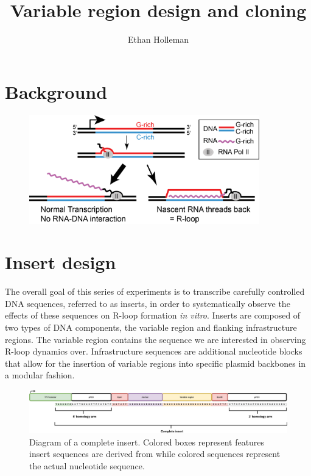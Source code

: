 \documentclass[11pt]{article}
\author{Ethan Holleman}
\title{Variable region design and cloning}
\begin{document}
\maketitle

\section{Background}



\begin{figure}[H]
	\includegraphics[width=10cm]{images/r-loops/Entanglement-1024x482.png}
	\centering
	\caption{}
	\label{fig:1}
\end{figure}


\section{Insert design}

The overall goal of this series of experiments is to transcribe carefully controlled DNA sequences, referred to as inserts, in order to systematically observe the effects of these sequences on R-loop formation \emph{in vitro}. Inserts are composed of two types of DNA components, the variable region and flanking infrastructure regions. The variable region contains the sequence we are interested in observing R-loop dynamics over. Infrastructure sequences are additional nucleotide blocks that allow for the insertion of variable regions into specific plasmid backbones in a modular fashion. 

\begin{figure}[H]
	\includegraphics[width=16cm]{images/variable_region/construct_diagrams-Detailed-Insert.png}
	\centering
	\caption{Diagram of a complete insert. Colored boxes represent features insert sequences are derived from while colored sequences represent the actual nucleotide sequence.}
	\label{fig:1}
\end{figure}
\end{document}
